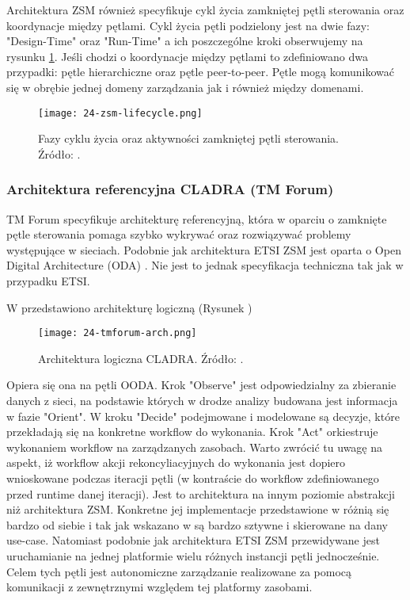 Architektura ZSM również specyfikuje cykl życia zamkniętej pętli sterowania oraz koordynacje między pętlami. Cykl życia pętli podzielony jest na dwie fazy: "Design-Time" oraz "Run-Time" a ich poszczególne kroki obserwujemy na rysunku \ref{fig:24-zsm-lifecycle}. Jeśli chodzi o koordynacje między pętlami to zdefiniowano dwa przypadki: pętle hierarchiczne oraz pętle peer-to-peer. Pętle mogą komunikować się w obrębie jednej domeny zarządzania jak i również między domenami. 

\begin{figure}[!htbp]
    \centering \texttt{[image: 24-zsm-lifecycle.png]}
    \caption{Fazy cyklu życia oraz aktywności zamkniętej pętli sterowania. Źródło: \cite{etsizsm2019}.}\label{fig:24-zsm-lifecycle}
\end{figure}




\subsubsection{Architektura referencyjna CLADRA (TM Forum)}\hypertarget{sec:cladra}{}

TM Forum specyfikuje architekturę referencyjną, która w oparciu o zamknięte pętle sterowania pomaga szybko wykrywać oraz rozwiązywać problemy występujące w sieciach. Podobnie jak architektura ETSI ZSM jest oparta o Open Digital Architecture (ODA) \cite{tmforum2018}. Nie jest to jednak specyfikacja techniczna tak jak w przypadku ETSI. 

W \cite{tmforum2021} przedstawiono architekturę logiczną (Rysunek )

\begin{figure}[!htbp]
    \centering \texttt{[image: 24-tmforum-arch.png]}
    \caption{Architektura logiczna CLADRA. Źródło: \cite{tmforum2021}.}\label{fig:24-tmforum-arch}
\end{figure}

Opiera się ona na pętli OODA. Krok "Observe" jest odpowiedzialny za zbieranie danych z sieci, na podstawie których w drodze analizy budowana jest informacja w fazie "Orient". W kroku "Decide" podejmowane i modelowane są decyzje, które przekładają się na konkretne workflow do wykonania. Krok "Act" orkiestruje wykonaniem workflow na zarządzanych zasobach. Warto zwrócić tu uwagę na aspekt, iż workflow akcji rekoncyliacyjnych do wykonania jest dopiero wnioskowane podczas iteracji pętli (w kontraście do workflow zdefiniowanego przed runtime danej iteracji). Jest to architektura na innym poziomie abstrakcji niż architektura ZSM. Konkretne jej implementacje przedstawione w \cite{tmforum2022} różnią się bardzo od siebie i tak jak wskazano w \cite{fallon2019} są bardzo sztywne i skierowane na dany use-case. Natomiast podobnie jak architektura ETSI ZSM przewidywane jest uruchamianie na jednej platformie wielu różnych instancji pętli jednocześnie. Celem tych pętli jest autonomiczne zarządzanie realizowane za pomocą komunikacji z zewnętrznymi względem tej platformy zasobami. 

